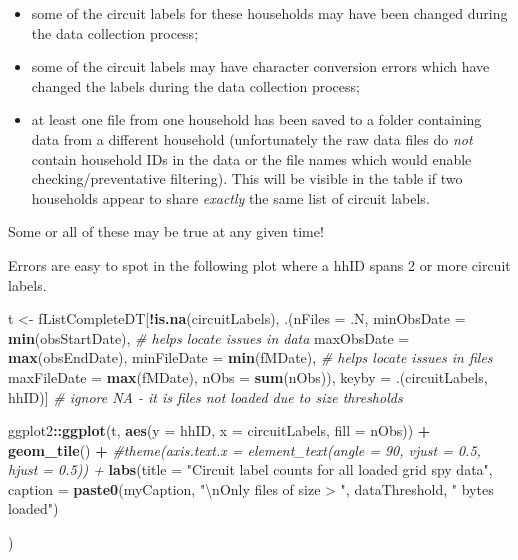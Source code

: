 \documentclass[]{article}
\newenvironment{Shaded}{\begin{snugshade}}{\end{snugshade}}
\newcommand{\KeywordTok}[1]{\textcolor[rgb]{0.13,0.29,0.53}{\textbf{#1}}}
\newcommand{\DataTypeTok}[1]{\textcolor[rgb]{0.13,0.29,0.53}{#1}}
\newcommand{\CharTok}[1]{\textcolor[rgb]{0.31,0.60,0.02}{#1}}
\newcommand{\StringTok}[1]{\textcolor[rgb]{0.31,0.60,0.02}{#1}}
\newcommand{\CommentTok}[1]{\textcolor[rgb]{0.56,0.35,0.01}{\textit{#1}}}
\newcommand{\OperatorTok}[1]{\textcolor[rgb]{0.81,0.36,0.00}{\textbf{#1}}}
\newcommand{\NormalTok}[1]{#1}
\providecommand{\tightlist}{%
  \setlength{\itemsep}{0pt}\setlength{\parskip}{0pt}}
\begin{document}
\begin{itemize}
\tightlist
\item
  some of the circuit labels for these households may have been changed
  during the data collection process;
\item
  some of the circuit labels may have character conversion errors which
  have changed the labels during the data collection process;
\item
  at least one file from one household has been saved to a folder
  containing data from a different household (unfortunately the raw data
  files do \emph{not} contain household IDs in the data or the file
  names which would enable checking/preventative filtering). This will
  be visible in the table if two households appear to share
  \emph{exactly} the same list of circuit labels.
\end{itemize}

Some or all of these may be true at any given time!

Errors are easy to spot in the following plot where a hhID spans 2 or
more circuit labels.

\begin{Shaded}
\begin{Highlighting}[]
\NormalTok{t <-}\StringTok{ }\NormalTok{fListCompleteDT[}\OperatorTok{!}\KeywordTok{is.na}\NormalTok{(circuitLabels), .(}\DataTypeTok{nFiles =}\NormalTok{ .N,}
                                              \DataTypeTok{minObsDate =} \KeywordTok{min}\NormalTok{(obsStartDate), }\CommentTok{# helps locate issues in data}
                                              \DataTypeTok{maxObsDate =} \KeywordTok{max}\NormalTok{(obsEndDate),}
                                              \DataTypeTok{minFileDate =} \KeywordTok{min}\NormalTok{(fMDate), }\CommentTok{# helps locate issues in files}
                                              \DataTypeTok{maxFileDate =} \KeywordTok{max}\NormalTok{(fMDate),}
                                              \DataTypeTok{nObs =} \KeywordTok{sum}\NormalTok{(nObs)),}
\NormalTok{                     keyby =}\StringTok{ }\NormalTok{.(circuitLabels, hhID)] }\CommentTok{# ignore NA - it is files not loaded due to size thresholds}

\NormalTok{ggplot2}\OperatorTok{::}\KeywordTok{ggplot}\NormalTok{(t, }\KeywordTok{aes}\NormalTok{(}\DataTypeTok{y =}\NormalTok{ hhID, }\DataTypeTok{x =}\NormalTok{ circuitLabels, }\DataTypeTok{fill =}\NormalTok{ nObs)) }\OperatorTok{+}
\StringTok{  }\KeywordTok{geom_tile}\NormalTok{() }\OperatorTok{+}
\StringTok{  }\CommentTok{#theme(axis.text.x = element_text(angle = 90, vjust = 0.5, hjust = 0.5)) + }
\StringTok{  }\KeywordTok{labs}\NormalTok{(}\DataTypeTok{title =} \StringTok{"Circuit label counts for all loaded grid spy data"}\NormalTok{,}
       \DataTypeTok{caption =} \KeywordTok{paste0}\NormalTok{(myCaption,}
                        \StringTok{"}\CharTok{\textbackslash{}n}\StringTok{Only files of size > "}\NormalTok{, dataThreshold, }\StringTok{" bytes loaded"}\NormalTok{)}
       
\NormalTok{  )}
\end{Highlighting}
\end{Shaded}
\end{document}

